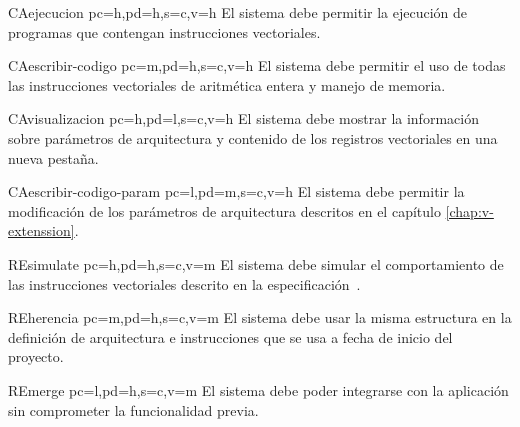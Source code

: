 \printureqtemplate{}

\begin{userReq}{CA}{ejecucion}
    {pc=h,pd=h,s=c,v=h}
    El sistema debe permitir la ejecución de programas que contengan instrucciones vectoriales.
\end{userReq}

\begin{userReq}{CA}{escribir-codigo}
    {pc=m,pd=h,s=c,v=h}
    El sistema debe permitir el uso de todas las instrucciones vectoriales de aritmética entera y manejo de memoria.
\end{userReq}

\begin{userReq}{CA}{visualizacion}
    {pc=h,pd=l,s=c,v=h}
    El sistema debe mostrar la información sobre parámetros de arquitectura y contenido de los registros vectoriales en una nueva pestaña.
\end{userReq}

\begin{userReq}{CA}{escribir-codigo-param}
    {pc=l,pd=m,s=c,v=h}
    El sistema debe permitir la modificación de los parámetros de arquitectura descritos en el capítulo \ref{chap:v-extenssion}.
\end{userReq}

\begin{userReq}{RE}{simulate}
    {pc=h,pd=h,s=c,v=m}
    El sistema debe simular el comportamiento de las instrucciones vectoriales descrito en la especificación~\cite{riscv-isa2024}. 
\end{userReq}

\begin{userReq}{RE}{herencia}
    {pc=m,pd=h,s=c,v=m}
    El sistema debe usar la misma estructura en la definición de arquitectura e instrucciones que se usa a fecha de inicio del proyecto.
\end{userReq}

\begin{userReq}{RE}{merge}
    {pc=l,pd=h,s=c,v=m}
    El sistema debe poder integrarse con la aplicación sin comprometer la funcionalidad previa.
\end{userReq}

\FloatBarrier

